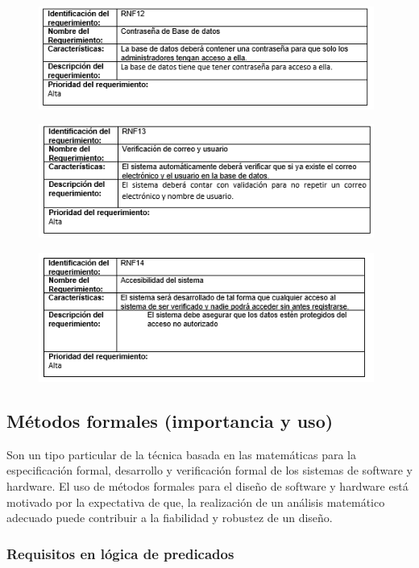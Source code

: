 \begin{figure}[htb]
\begin{center}
\includegraphics[width=11cm]{./imagenes/tablas/RNF12.png}
\end{center}

\end{figure}


\newpage


\begin{figure}[htb]
\begin{center}
\includegraphics[width=11cm]{./imagenes/tablas/RNF13.png}
\end{center}

\end{figure}





\begin{figure}[htb]
\begin{center}
\includegraphics[width=11cm]{./imagenes/tablas/RNF14.png}
\end{center}

\end{figure}


\subsection{Métodos formales (importancia y uso)}
Son un tipo particular de la técnica basada en las matemáticas para la especificación formal, desarrollo y verificación formal de los sistemas de software y hardware. El uso de métodos formales para el diseño de software y hardware está motivado por la expectativa de que, la realización de un análisis matemático adecuado puede contribuir a la fiabilidad y robustez de un diseño. 

\subsubsection{Requisitos en lógica de predicados}

